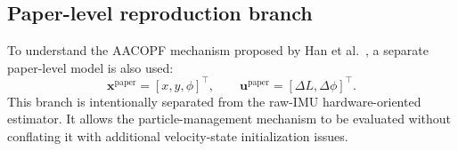 \subsection{Paper-level reproduction branch}
To understand the AACOPF mechanism proposed by Han et al.~\cite{han2020cooperative}, a separate paper-level model is also used:
\begin{equation}
    \bm{x}^{\mathrm{paper}}=[x,y,\phi]^\top,
    \qquad
    \bm{u}^{\mathrm{paper}}=[\Delta L,\Delta\phi]^\top.
\end{equation}
This branch is intentionally separated from the raw-IMU hardware-oriented estimator. It allows the particle-management mechanism to be evaluated without conflating it with additional velocity-state initialization issues.
